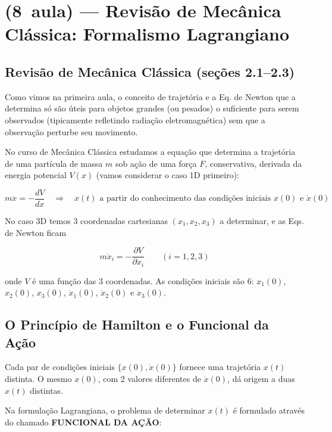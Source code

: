 \section*{(8\textordfeminine\ aula) --- Revisão de Mecânica Clássica: Formalismo Lagrangiano}

\subsection*{Revisão de Mecânica Clássica (seções 2.1--2.3)}

Como vimos na primeira aula, o conceito de trajetória e a Eq. de Newton que a determina só são úteis para objetos grandes (ou pesados) o suficiente para serem observados (tipicamente refletindo radiação eletromagnética) sem que a observação perturbe seu movimento.

No curso de Mecânica Clássica estudamos a equação que determina a trajetória de uma partícula de massa $m$ sob ação de uma força $F$, conservativa, derivada da energia potencial $V(x)$ (vamos considerar o caso 1D primeiro):

\begin{equation}
m\ddot{x} = -\frac{dV}{dx} \quad \Longrightarrow \quad x(t) \text{ a partir do conhecimento das condições iniciais } x(0) \text{ e } \dot{x}(0)
\label{eq:aula8_newton1d}
\end{equation}

No caso 3D temos 3 coordenadas cartesianas $(x_1, x_2, x_3)$ a determinar, e as Eqs. de Newton ficam

\begin{equation}
m\ddot{x}_i = -\frac{\partial V}{\partial x_i} \qquad (i = 1, 2, 3)
\label{eq:aula8_newton3d}
\end{equation}

onde $V$ é uma função das 3 coordenadas. As condições iniciais são 6: $x_1(0)$, $x_2(0)$, $x_3(0)$, $\dot{x}_1(0)$, $\dot{x}_2(0)$ e $\dot{x}_3(0)$.

\subsection*{O Princípio de Hamilton e o Funcional da Ação}

Cada par de condições iniciais $\{x(0), \dot{x}(0)\}$ fornece uma trajetória $x(t)$ distinta. O mesmo $x(0)$, com 2 valores diferentes de $\dot{x}(0)$, dá origem a duas $x(t)$ distintas.

Na formulação Lagrangiana, o problema de determinar $x(t)$ é formulado através do chamado \textbf{FUNCIONAL DA AÇÃO}:

